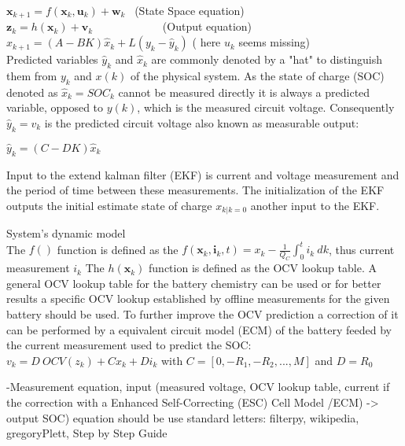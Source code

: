 $  {\boldsymbol {x}}_{k+1}=f({\boldsymbol {x}}_{k},{\boldsymbol {u}}_{k})+ {\boldsymbol {w}}_{k} $ \ (State Space equation)  \\
$  {\boldsymbol  {z}}_{{k}}=h({\boldsymbol  {x}}_{{k}})+{\boldsymbol  {v}}_{{k}} $ \ \ \ \ \ \ \ \ \ \ \  \ (Output equation)  \\


$ {\hat  {x}}_{k+1}=\left(A-BK\right){\hat  {x}}_{k}+L\left(y_{k}-{\hat  {y}}_{k}\right) $  ( here $u_{k}$ seems missing)\\

Predicted variables $ \hat{y}_{k}$ and $ \hat{x}_{k} $  are commonly denoted by a "hat" to distinguish them from  $ {y}_{k} $ and $ {x}(k) $  of the physical system. As the state of charge (SOC) denoted as $\hat{x}_{k} = SOC_{k}$  cannot be measured directly it is always a predicted variable, opposed to ${y}(k)$, which is the measured circuit voltage. Consequently $ \hat{y}_{k} = {v}_{k} $ is the predicted circuit voltage also known as measurable output: 

$ {\hat{y}}_{k}=\left(C-DK\right){\hat{x}}_{k} $ 

Input to the extend kalman filter (EKF) is current and voltage measurement and the period of time between these measurements. The initialization of the EKF outputs the initial estimate state of charge  ${x}_{k|k=0} $ another input to the EKF. 

{System's dynamic model} \\
The $f() $ function is defined as the $ f({\boldsymbol {x}}_{k},{\boldsymbol {i}}_{k},t) = {x}_{k} - \frac{1}{{Q_{C}}}\int_{0}^{t} {i_{k}\ dk} $, thus current measurement $ {i}_{k} $ 
The $h({\boldsymbol {x}}_{{k}})$ function is defined as the OCV lookup table. A general OCV lookup table for the battery chemistry can be used or for better results a specific OCV lookup established by offline measurements for  the given battery should be used. 
To further improve the OCV prediction a correction of it can be performed by a equivalent circuit model (ECM) of the battery feeded by the current measurement used to predict the SOC: 
$ {v}_{k} = {D} \ {OCV}({z}_{k}) + C {x}_{k}  +  D {i}_{k}  $ 
with $ C = [0, -R_1, -R_2, ..., M] $ and $ D = R_0 $

-Measurement equation, input (measured voltage, OCV lookup table, current if the correction with a Enhanced Self-Correcting (ESC) Cell Model /ECM) -> output SOC)
equation should be use standard letters: filterpy, wikipedia, gregoryPlett, Step by Step Guide

